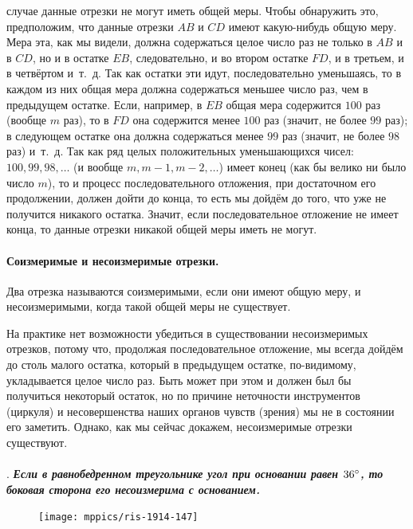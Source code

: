 \documentclass[oneside]{book}
\begin{document}
\smallskip
{} случае данные отрезки не могут иметь общей меры.
Чтобы обнаружить это, предположим, что данные отрезки $AB$ и $CD$ имеют какую-нибудь общую меру.
Мера эта, как мы видели, должна содержаться целое число раз не только в $AB$ и в $CD$, но и в остатке $EB$, следовательно, и во втором остатке $FD$, и в третьем, и в четвёртом и~т.~д.
Так как остатки эти идут, последовательно уменьшаясь, то в каждом из них общая мера должна содержаться меньшее число раз, чем в предыдущем остатке.
Если, например, в $EB$ общая мера содержится $100$ раз (вообще $m$ раз), то в $FD$ она содержится менее $100$ раз (значит, не более $99$ раз);
в следующем остатке она должна содержаться менее $99$ раз (значит, не более $98$ раз) и~т.~д.
Так как ряд целых положительных уменьшающихся чисел:
$100, 99, 98, \dots$
(и вообще $m, m-1, m-2,\dots$) имеет конец (как бы велико ни было число $m$), то и процесс последовательного отложения, при достаточном его продолжении, должен дойти до конца, то есть мы дойдём до того, что уже не получится никакого остатка.
Значит, если последовательное отложение не имеет конца, то данные отрезки никакой общей меры иметь не могут.

\paragraph{Соизмеримые и несоизмеримые отрезки.}\label{1938/148}
Два отрезка называются соизмеримыми, если они имеют общую меру, и несоизмеримыми, когда такой общей меры не существует.

На практике нет возможности убедиться в существовании несоизмеримых отрезков, потому что, продолжая последовательное отложение, мы всегда дойдём до столь малого остатка, который в предыдущем остатке, по-видимому, укладывается целое число раз.
Быть может при этом и должен был бы получиться некоторый остаток, но по причине неточности инструментов (циркуля) и несовершенства наших органов чувств (зрения) мы не в состоянии его заметить.
Однако, как мы сейчас докажем, несоизмеримые отрезки существуют.


\paragraph{}\label{1914/156}
.
\textbf{\emph{Если в равнобедренном треугольнике угол при основании равен $36\degree$, то боковая сторона его несоизмерима с основанием.}}

\begin{figure}
\centering
\texttt{[image: mppics/ris-1914-147]}
\caption{}\label{1914/ris-147}
\end{figure}
\end{document}
